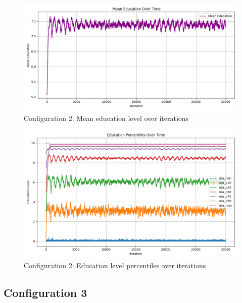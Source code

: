 \documentclass[english]{projectreport}
\begin{document}
    \begin{figure}[H]
        \centering
        \includegraphics[width=0.8\linewidth]{metrics_config2/metrics_config2_mean_education.png}
        \caption{Configuration 2: Mean education level over iterations}
        \label{fig:c0-mean_education}
    \end{figure}

    \begin{figure}[H]
        \centering
        \includegraphics[width=0.8\linewidth]{metrics_config2/metrics_config2_education_perc_time.png}
        \caption{Configuration 2: Education level percentiles over iterations}
        \label{fig:c0-education_perc_time}
    \end{figure}

\subsection*{Configuration 3}
\end{document}
